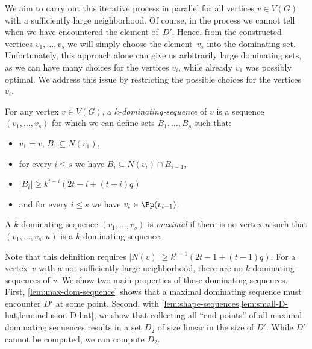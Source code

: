 We aim to carry out this iterative process in parallel
for all vertices \mbox{$v\in V(G)$} with a sufficiently large neighborhood.
Of course, in the process
we cannot tell when we have encountered the element of~$D'$.
Hence, from the constructed vertices $v_1,\ldots, v_s$
we will simply choose the element~$v_s$ into the dominating set.
Unfortunately, this approach alone can give us arbitrarily large
dominating sets, as we can have many choices for the vertices
$v_i$, while already $v_1$ was possibly optimal.
We address this issue by restricting
the possible choices for the vertices~$v_i$.

\begin{definition}\label{def:dom-sequence}
  For any vertex $v\in V(G)$, a {\em $k$-dominating-sequence} of $v$ is a sequence
  $(v_1,\ldots,v_s)$ for which we can define sets $B_1,\ldots,B_s$ such that:
  \begin{itemize}
    \item $v_1=v$, $B_1 \subseteq N(v_1)$,
    \item for every $i\le s$ we have $B_{i} \subseteq N(v_{i})\cap B_{i-1}$,
    \item $|B_{i}|\geq k^{t-i}(2t-i+(t-i)q)$
    \item and for every $i\le s$ we have $v_i\in \Pp(v_{i-1})$.
  \end{itemize}
  A $k$-dominating-sequence $(v_1,\ldots,v_s)$ is {\em maximal} if there is no
  vertex $u$ such that $(v_1,\ldots,v_s,u)$ is a $k$-dominating-sequence.
\end{definition}

Note that this definition requires $|N(v)|\ge k^{t-1}(2t-1+(t-1)q)$. For a
vertex~$v$ with a not sufficiently large neighborhood, there are no
$k$-dominating-sequences of $v$.
We show two main properties of these dominating-sequences.
First, \cref{lem:max-dom-sequence} shows that a maximal dominating sequence must
encounter $D'$ at some point. Second, with \cref{lem:shape-sequences,lem:small-D-hat,lem:inclusion-D-hat},
we show that collecting all ``end points'' of all maximal dominating sequences
results in a set $D_2$ of size linear in the size of $D'$. While $D'$ cannot be computed, we
can compute $D_2$.
%

